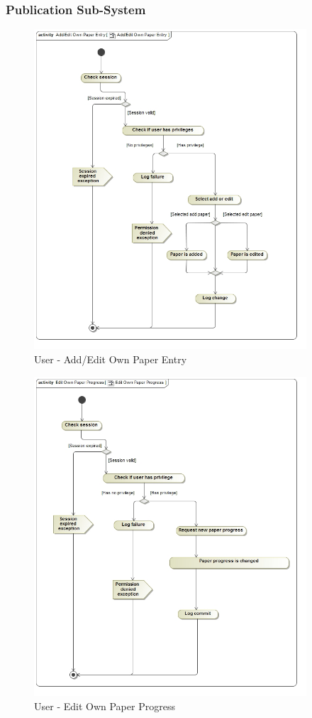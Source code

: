 \documentclass{article}
\begin{document}
		\subsubsection{Publication Sub-System}
			\begin{figure}[H]
				\includegraphics[width=4in, center]{../Diagrams/Process Specifications/Publication subsystem/Add_Edit Own Paper Entry.jpg}
				\caption{User - Add/Edit Own Paper Entry}
			\end{figure}
			\begin{figure}[H]
				\includegraphics[width=4in, center]{../Diagrams/Process Specifications/Publication subsystem/Edit Own Paper Progress.jpg}
				\caption{User - Edit Own Paper Progress}
			\end{figure}
\end{document}
